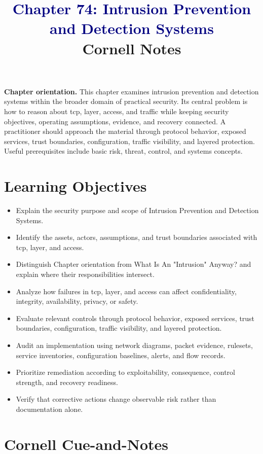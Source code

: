 \documentclass[11pt]{article}
\title{\textcolor{Navy}{Chapter 74: Intrusion Prevention and Detection Systems}\\[2mm]\large Cornell Notes}
\author{}
\date{}
\begin{document}
\maketitle
\thispagestyle{fancy}
\vspace{-1.5em}
\begin{orientationbox}
\textbf{Chapter orientation.} This chapter examines intrusion prevention and detection systems within the broader domain of practical security. Its central problem is how to reason about tcp, layer, access, and traffic while keeping security objectives, operating assumptions, evidence, and recovery connected. A practitioner should approach the material through protocol behavior, exposed services, trust boundaries, configuration, traffic visibility, and layered protection. Useful prerequisites include basic risk, threat, control, and systems concepts.
\end{orientationbox}
\section*{Learning Objectives}
\begin{itemize}
\item Explain the security purpose and scope of Intrusion Prevention and Detection Systems.
\item Identify the assets, actors, assumptions, and trust boundaries associated with tcp, layer, and access.
\item Distinguish Chapter orientation from What Is An "Intrusion" Anyway? and explain where their responsibilities intersect.
\item Analyze how failures in tcp, layer, and access can affect confidentiality, integrity, availability, privacy, or safety.
\item Evaluate relevant controls through protocol behavior, exposed services, trust boundaries, configuration, traffic visibility, and layered protection.
\item Audit an implementation using network diagrams, packet evidence, rulesets, service inventories, configuration baselines, alerts, and flow records.
\item Prioritize remediation according to exploitability, consequence, control strength, and recovery readiness.
\item Verify that corrective actions change observable risk rather than documentation alone.
\end{itemize}
\section*{Cornell Cue-and-Notes}
\end{document}
